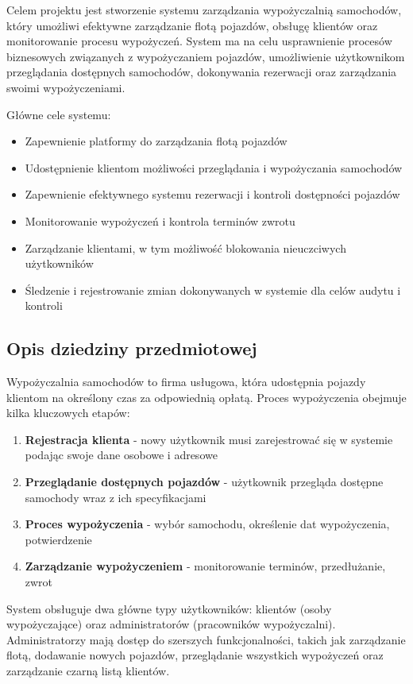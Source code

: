 \documentclass[12pt,a4paper]{article}
\begin{document}
Celem projektu jest stworzenie systemu zarządzania wypożyczalnią samochodów, który umożliwi efektywne zarządzanie flotą pojazdów, obsługę klientów oraz monitorowanie procesu wypożyczeń. System ma na celu usprawnienie procesów biznesowych związanych z wypożyczaniem pojazdów, umożliwienie użytkownikom przeglądania dostępnych samochodów, dokonywania rezerwacji oraz zarządzania swoimi wypożyczeniami.

Główne cele systemu:
\begin{itemize}
    \item Zapewnienie platformy do zarządzania flotą pojazdów
    \item Udostępnienie klientom możliwości przeglądania i wypożyczania samochodów
    \item Zapewnienie efektywnego systemu rezerwacji i kontroli dostępności pojazdów
    \item Monitorowanie wypożyczeń i kontrola terminów zwrotu
    \item Zarządzanie klientami, w tym możliwość blokowania nieuczciwych użytkowników
    \item Śledzenie i rejestrowanie zmian dokonywanych w systemie dla celów audytu i kontroli
\end{itemize}

\subsection{Opis dziedziny przedmiotowej}

Wypożyczalnia samochodów to firma usługowa, która udostępnia pojazdy klientom na określony czas za odpowiednią opłatą. Proces wypożyczenia obejmuje kilka kluczowych etapów:

\begin{enumerate}
    \item \textbf{Rejestracja klienta} - nowy użytkownik musi zarejestrować się w systemie podając swoje dane osobowe i adresowe
    \item \textbf{Przeglądanie dostępnych pojazdów} - użytkownik przegląda dostępne samochody wraz z ich specyfikacjami
    \item \textbf{Proces wypożyczenia} - wybór samochodu, określenie dat wypożyczenia, potwierdzenie
    \item \textbf{Zarządzanie wypożyczeniem} - monitorowanie terminów, przedłużanie, zwrot
\end{enumerate}

\newpage

System obsługuje dwa główne typy użytkowników: klientów (osoby wypożyczające) oraz administratorów (pracowników wypożyczalni). Administratorzy mają dostęp do szerszych funkcjonalności, takich jak zarządzanie flotą, dodawanie nowych pojazdów, przeglądanie wszystkich wypożyczeń oraz zarządzanie czarną listą klientów.
\end{document}
